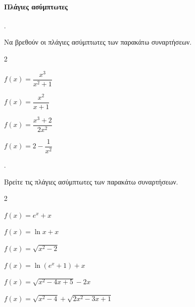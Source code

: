 \documentclass[11pt,a4paper,twocolumn]{article}
\newcounter{askhsh}
\newcommand{\askhsh}{\large\theaskhsh.\ \addtocounter{askhsh}{1}}
\begin{document}
\paragraph{Πλάγιες ασύμπτωτες}
\askhsh Να βρεθούν οι πλάγιες ασύμπτωτες των παρακάτω συναρτήσεων.
\begin{multicols}{2}
\begin{alist}
\item $f(x)=\dfrac{x^3}{x^2+1}$
\item $f(x)=\dfrac{x^2}{x+1}$
\item $f(x)=\dfrac{x^3+2}{2x^2}$
\item $f(x)=2-\dfrac{1}{x^2}$
\end{alist}
\end{multicols}
\askhsh Βρείτε τις πλάγιες ασύμπτωτες των παρακάτω συναρτήσεων.
\begin{alist}
\begin{multicols}{2}
\item $f(x)=e^x+x$
\item $f(x)=\ln{x}+x$
\item $f(x)=\sqrt{x^2-2}$
\end{multicols}
\item $f(x)=\ln{\left(e^x+1\right)}+x$
\item $f(x)=\sqrt{x^2-4x+5}-2x$
\item $f(x)=\sqrt{x^2-4}+\sqrt{2x^2-3x+1}$
\end{alist}
\end{document}

